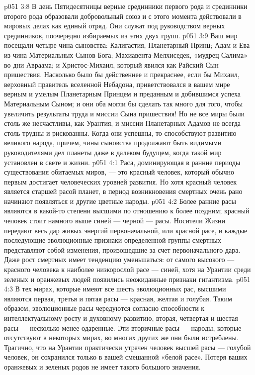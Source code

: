 \vs p051 3:8 В день Пятидесятницы верные срединники первого рода и срединники второго рода образовали добровольный союз и с этого момента действовали в мировых делах как единый отряд. Они служат под руководством верных срединников, поочередно избираемых из этих двух групп.
\vs p051 3:9 \pc Ваш мир посещали четыре чина сыновства: Калигастия, Планетарный Принц; Адам и Ева из чина Материальных Сынов Бога; Махиавента\hyp{}Мелхиседек, «мудрец Салима» во дни Авраама; и Христос\hyp{}Михаил, который явился как Райский Сын пришествия. Насколько было бы действеннее и прекраснее, если бы Михаил, верховный правитель вселенной Небадона, приветствовался в вашем мире верным и умелым Планетарным Принцем и преданным и добившимся успеха Материальным Сыном; и они оба могли бы сделать так много для того, чтобы увеличить результаты труда и миссии Сына пришествия! Но не все миры были столь же несчастливы, как Урантия, и миссии Планетарных Адамов не всегда столь трудны и рискованны. Когда они успешны, то способствуют развитию великого народа, причем, чины сыновства продолжают быть видимыми руководителями дел планеты даже в далеком будущем, когда такой мир установлен в свете и жизни.
\vs p051 4:1 Раса, доминирующая в ранние периоды существования обитаемых миров, --- это красный человек, который обычно первым достигает человеческих уровней развития. Но хотя красный человек является старшей расой планет, в период возникновения смертных очень рано начинают появляться и другие цветные народы.
\vs p051 4:2 Более ранние расы являются в какой\hyp{}то степени высшими по отношению к более поздним; красный человек стоит намного выше синей --- черной --- расы. Носители Жизни передают весь дар живых энергий первоначальной, или красной расе, и каждые последующие эволюционные признаки определенной группы смертных представляют собой изменения, произошедшие за счет первоначального дара. Даже рост смертных имеет тенденцию уменьшаться: от самого высокого --- красного человека к наиболее низкорослой расе --- синей, хотя на Урантии среди зеленых и оранжевых людей появились неожиданные признаки гигантизма.
\vs p051 4:3 В тех мирах, которые имеют все шесть эволюционных рас, высшими являются первая, третья и пятая расы --- красная, желтая и голубая. Таким образом, эволюционные расы чередуются согласно способности к интеллектуальному росту и духовному развитию, вторая, четвертая и шестая расы --- несколько менее одаренные. Эти вторичные расы --- народы, которые отсутствуют в некоторых мирах, во многих других же они были истреблены. Трагично, что на Урантии практически утрачен человек высшей расы --- голубой человек, он сохранился только в вашей смешанной «белой расе». Потеря ваших оранжевых и зеленых родов не имеет такого большого значения.
